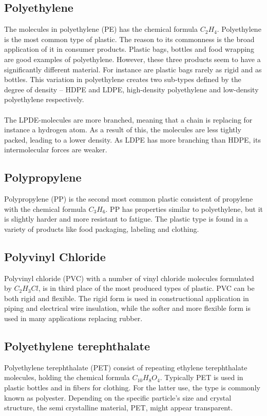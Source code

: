 \subsection{Polyethylene}
The molecules in polyethylene (PE) has the chemical formula $C_2H_4$. Polyethylene is the most common type of plastic. The reason to its commonness is the broad application of it in consumer products. Plastic bags, bottles and food wrapping are good examples of polyethylene. However, these three products seem to have a significantly different material. For instance are plastic bags rarely as rigid and as bottles. This variation in polyethylene creates two sub-types defined by the degree of density – HDPE and LDPE, high-density polyethylene and low-density polyethylene respectively. 
\\\\
The LPDE-molecules are more branched, meaning that a chain is replacing for instance a hydrogen atom. As a result of this, the molecules are less tightly packed, leading to a lower density.  As LDPE has more branching than HDPE, its intermolecular forces are weaker. 


\subsection{Polypropylene}
Polypropylene (PP) is the second most common plastic consistent of propylene with the chemical formula $C_3H_6$. PP has properties similar to polyethylene, but it is slightly harder and more resistant to fatigue. The plastic type is found in a variety of products like food packaging, labeling and clothing. 

\subsection{Polyvinyl Chloride}
Polyvinyl chloride (PVC) with a number of vinyl chloride molecules formulated by $C_2H_3Cl$, is in third place of the most produced types of plastic. PVC can be both rigid and flexible. The rigid form is used in constructional application in piping and electrical wire insulation, while the softer and more flexible form is used in many applications replacing rubber. 

\subsection{Polyethylene terephthalate}
Polyethylene terephthalate (PET) consist of repeating ethylene terephthalate molecules, holding the chemical formula $C_{10}H_8O_4$. Typically PET is used in plastic bottles and in fibers for clothing. For the latter use, the type is commonly known as polyester. Depending on the specific particle's size and crystal structure, the semi crystalline material, PET, might appear transparent. 

